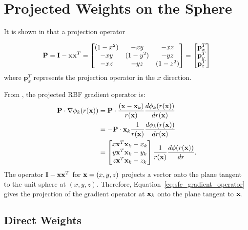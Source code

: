 %
% 
%
%


\chapter{Projected Weights on the Sphere} 
\label{app:indirect_weights}

It is shown in \cite{FlyerWright09, FlyerLehto11} that a projection operator

$$ 
\mathbf{P} =  \mathbf{I} - \mathbf{x} \mathbf{x}^{T} = \begin{bmatrix} 
(1 - x^{2}) & -xy & -xz \\ 
-xy & (1 - y^{2}) & -yz \\ 
-xz & -yz & (1-z^{2})
\end{bmatrix} = \begin{bmatrix} \mathbf{p}_{x}^{T} \\ \mathbf{p}_{y}^{T} \\ \mathbf{p}_{z}^{T} \end{bmatrix}
$$
where $\mathbf{p}_{x}^{T}$ represents the projection operator in the $x$ direction. 

From \cite{FlyerWright09}, the projected RBF gradient operator is:
\begin{align}
\mathbf{P} \cdot \nabla \phi_{k}(r(\vx)) & = \mathbf{P} \cdot \frac{(\vx-\vx_{k})}{r(\vx)} \d{\phi_{k}(r(\vx))}{r(\vx)}  \nonumber \\
& = -\mathbf{P} \cdot \vx_{k}\frac{1}{r(\vx)} \d{\phi_{k}(r(\vx))}{r(\vx)}  \nonumber \\ %
& = \begin{bmatrix} x \vx^{T} \vx_{k} - x_{k} \\  y \vx^{T} \vx_{k} - y_{k} \\  z \vx^{T} \vx_{k} - z_{k} \end{bmatrix} \frac{1}{r(\vx)} \d{\phi(r(\vx))}{r} \label{eq:sfc_gradient_operator}.
\end{align}
The operator $\mathbf{I} - \mathbf{x} \mathbf{x}^{T}$ for $\mathbf{x} = (x,y,z)$ projects a vector onto the plane tangent to the unit sphere at $(x,y,z)$. Therefore, Equation~\ref{eq:sfc_gradient_operator} gives the projection of the gradient operator at $\mathbf{x}_{k}$ onto the plane tangent to $\mathbf{x}$. 

\section{Direct Weights} 

